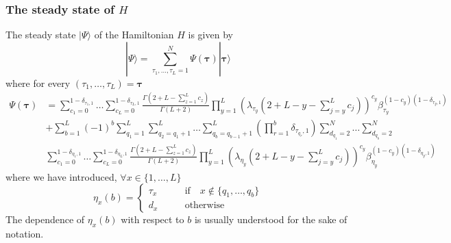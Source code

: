 \documentclass[11pt]{article}
\numberwithin{equation}{section}
\numberwithin{equation}{subsection}
\begin{document}
\subsubsection{The steady state of $H$}\label{subsectionSSH}
The steady state $|\Psi\rangle$ of the Hamiltonian $H$ is given by 
\begin{equation}\label{steadyStateH}
    |\Psi\rangle=\sum_{\tau_{1},\ldots,\tau_{L}=1}^{N}\Psi(\bm{\tau})|\bm{\tau}\rangle
\end{equation}
where for every $(\tau_{1},\ldots,\tau_{L})=\bm{\tau}$
\begin{equation}
	\begin{split}
 \Psi(\bm{\tau})&=\sum_{c_{1}=0}^{1-\delta_{\tau_{1},1}}\ldots\sum_{c_{L}=0}^{1-\delta_{\tau_{L},1}}\frac{\Gamma(2+L-\sum_{z=1}^{L}c_{z})}{\Gamma(L+2)}\prod_{y=1}^{L}\left(\lambda_{\tau_{y}}\left(2+L-y-\sum_{j=y}^{L}c_{j}\right)\right)^{c_{y}}\beta_{\tau_{y}}^{(1-c_{y})(1-\delta_{\tau_{y},1})}
\\&+
\sum_{b=1}^{L}(-1)^{b}\sum_{q_{1}=1}^{L}\sum_{q_{2}=q_{1}+1}^{L}\ldots\sum_{q_{b}=q_{b-1}+1}^{L}\left(\prod_{r=1}^{b}\delta_{\tau_{q_{r}},1}\right) 
\sum_{d_{q_{1}}=2}^{N}\ldots\sum_{d_{q_{b}}=2}^{N}
\\&
\sum_{c_{1}=0}^{1-\delta_{\eta_{1},1}}\ldots\sum_{c_{L}=0}^{1-\delta_{\eta_{L},1}}\frac{\Gamma(2+L-\sum_{z=1}^{L}c_{z})}{\Gamma(L+2)}\prod_{y=1}^{L}\left(\lambda_{\eta_{y}}\left(2+L-y-\sum_{j=y}^{L}c_{j}\right)\right)^{c_{y}}\beta_{\eta_{y}}^{(1-c_{y})(1-\delta_{\eta_{y},1})}
	\end{split}
\end{equation}
where we have introduced, $\forall x\in \{1,\ldots,L\}$
\begin{equation}
	\eta_{x}(b)=\begin{cases}
		\tau_{x}\qquad &\text{if}\quad x\notin \{q_{1},\ldots,q_{b}\}\\
		d_{x}\qquad &\text{otherwise}
	\end{cases}%
\end{equation}
The dependence of $\eta_{x}(b)$ with respect to $b$ is usually understood for the sake of notation. 
\end{document}

